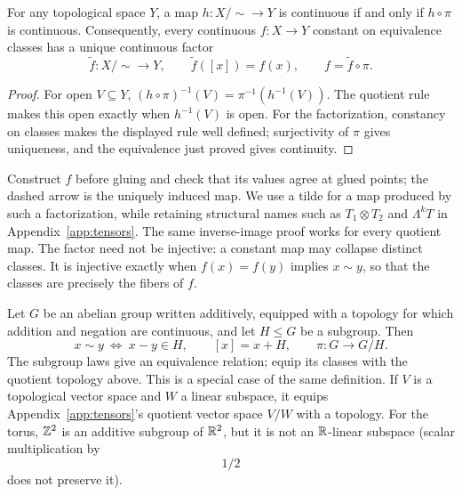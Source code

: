 \begin{proposition}\label{prop:quotient-universal}
For any topological space $Y$, a map $h:X/{\sim}\to Y$ is continuous
if and only if $h\circ\pi$ is continuous. Consequently, every continuous
$f:X\to Y$ constant on equivalence classes has a unique continuous factor
\[
\widetilde f:X/{\sim}\to Y,\qquad
\widetilde f([x])=f(x),\qquad f=\widetilde f\circ\pi.
\]
\end{proposition}
\begin{proof}
For open $V\subseteq Y$, $(h\circ\pi)^{-1}(V)=\pi^{-1}(h^{-1}(V))$.
The quotient rule makes this open exactly when $h^{-1}(V)$ is open.
For the factorization, constancy on classes makes the displayed rule
well defined; surjectivity of $\pi$ gives uniqueness, and the equivalence
just proved gives continuity.
\end{proof}
\begin{center}
\end{center}
Construct $f$ before gluing and check that its values agree at glued points;
the dashed arrow is the uniquely induced map. We use a tilde for a map
produced by such a factorization, while retaining structural names such as
$T_1\otimes T_2$ and $\Lambda^kT$ in Appendix~\ref{app:tensors}.
The same inverse-image proof works for every quotient map.
The factor need not be injective: a constant map may collapse distinct
classes. It is injective exactly when $f(x)=f(y)$ implies $x\sim y$,
so that the classes are precisely the fibers of $f$.

\begin{example}
Let $G$ be an abelian group written additively, equipped with a topology
for which addition and negation are continuous, and let $H\leq G$ be a subgroup.
Then
\[
x\sim y\ \Longleftrightarrow\ x-y\in H,\qquad [x]=x+H,\qquad
\pi:G\to G/H.
\]
The subgroup laws give an equivalence relation; equip its classes with the
quotient topology above. This is a special case of the same definition.
If $V$ is a topological vector space and $W$ a linear subspace, it equips
Appendix~\ref{app:tensors}'s quotient vector space $V/W$ with a topology. For the torus,
$\mathbb{Z}^2$ is an additive subgroup of $\mathbb{R}^2$, but it is not an $\mathbb{R}$-linear
subspace (scalar multiplication by
\[
1/2
\]
 does not preserve it).
\end{example}

